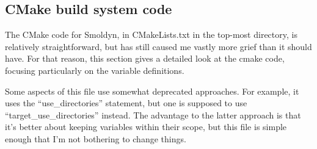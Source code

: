 \documentclass {book}
\begin{document}
\subsection{CMake build system code}

The CMake code for Smoldyn, in CMakeLists.txt in the top-most directory, is relatively straightforward, but has still caused me vastly more grief than it should have. For that reason, this section gives a detailed look at the cmake code, focusing particularly on the variable definitions.

Some aspects of this file use somewhat deprecated approaches. For example, it uses the ``use\_directories'' statement, but one is supposed to use ``target\_use\_directories'' instead. The advantage to the latter approach is that it's better about keeping variables within their scope, but this file is simple enough that I'm not bothering to change things.
\end{document}
